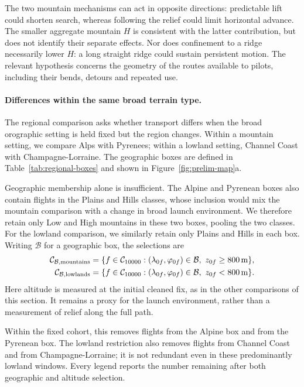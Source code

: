 The two mountain mechanisms can act in opposite directions: predictable lift
could shorten search, whereas following the relief could limit horizontal advance.
The smaller aggregate mountain $H$ is consistent with the latter contribution,
but does not identify their separate effects. Nor does confinement to a ridge
necessarily lower $H$: a long straight ridge could sustain persistent motion.
The relevant hypothesis concerns the geometry of the routes available to pilots,
including their bends, detours and repeated use.

\paragraph{Differences within the same broad terrain type.}
The regional comparison asks whether transport differs when the broad orographic
setting is held fixed but the region changes. Within a mountain setting, we
compare Alps with Pyrenees; within a lowland setting, Channel Coast with
Champagne-Lorraine. The geographic boxes are defined in
Table~\ref{tab:regional-boxes} and shown in Figure~\ref{fig:prelim-map}a.

Geographic membership alone is insufficient. The Alpine and Pyrenean boxes also
contain flights in the Plains and Hills classes, whose inclusion would mix the
mountain comparison with a change in broad launch environment. We therefore
retain only Low and High mountains in these two boxes, pooling the two classes.
For the lowland comparison, we similarly retain only Plains and Hills in each
box. Writing $\mathcal B$ for a geographic box, the selections are
\begin{align}
 \mathcal C_{\mathcal B,\mathrm{mountains}}
 &=\{f\in\mathcal C_{10000}:
 (\lambda_{0f},\varphi_{0f})\in\mathcal B,\ z_{0f}\geq800\,\mathrm{m}\},\notag\\
 \mathcal C_{\mathcal B,\mathrm{lowlands}}
 &=\{f\in\mathcal C_{10000}:
 (\lambda_{0f},\varphi_{0f})\in\mathcal B,\ z_{0f}<800\,\mathrm{m}\}.
 \label{eq:regional-preselection}
\end{align}
Here altitude is measured at the initial cleaned fix, as in the other comparisons
of this section. It remains a proxy for the launch environment, rather than a
measurement of relief along the full path.

Within the fixed cohort, this removes \CondAlpsExcluded{} flights from the Alpine
box and \CondPyreneesExcluded{} from the Pyrenean box. The lowland restriction also
removes \CondChannelCoastExcluded{} flights from Channel Coast and
\CondChampagneLorraineExcluded{} from Champagne-Lorraine; it is not redundant even
in these predominantly lowland windows. Every legend reports the number remaining
after both geographic and altitude selection.

